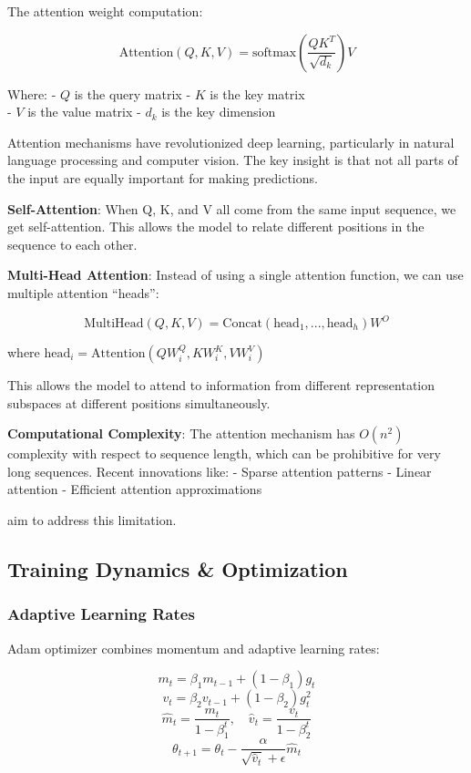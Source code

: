 \documentclass[
  11pt,
  letterpaper,
]{article}
\begin{document}
The attention weight computation:

\[\text{Attention}(Q, K, V) = \text{softmax}\left(\frac{QK^T}{\sqrt{d_k}}\right)V\]

Where: - \(Q\) is the query matrix - \(K\) is the key matrix\\
- \(V\) is the value matrix - \(d_k\) is the key dimension

Attention mechanisms have revolutionized deep learning, particularly in
natural language processing and computer vision. The key insight is that
not all parts of the input are equally important for making predictions.

\textbf{Self-Attention}: When Q, K, and V all come from the same input
sequence, we get self-attention. This allows the model to relate
different positions in the sequence to each other.

\textbf{Multi-Head Attention}: Instead of using a single attention
function, we can use multiple attention ``heads'':

\[\text{MultiHead}(Q, K, V) = \text{Concat}(\text{head}_1, ..., \text{head}_h)W^O\]

where \(\text{head}_i = \text{Attention}(QW_i^Q, KW_i^K, VW_i^V)\)

This allows the model to attend to information from different
representation subspaces at different positions simultaneously.

\textbf{Computational Complexity}: The attention mechanism has
\(O(n^2)\) complexity with respect to sequence length, which can be
prohibitive for very long sequences. Recent innovations like: - Sparse
attention patterns - Linear attention - Efficient attention
approximations

aim to address this limitation.

\subsection{Training Dynamics \&
Optimization}\label{training-dynamics-optimization}

\subsubsection{Adaptive Learning Rates}\label{adaptive-learning-rates}

Adam optimizer combines momentum and adaptive learning rates:

\[m_t = \beta_1 m_{t-1} + (1-\beta_1)g_t\]
\[v_t = \beta_2 v_{t-1} + (1-\beta_2)g_t^2\]
\[\hat{m}_t = \frac{m_t}{1-\beta_1^t}, \quad \hat{v}_t = \frac{v_t}{1-\beta_2^t}\]
\[\theta_{t+1} = \theta_t - \frac{\alpha}{\sqrt{\hat{v}_t} + \epsilon}\hat{m}_t\]
\end{document}

